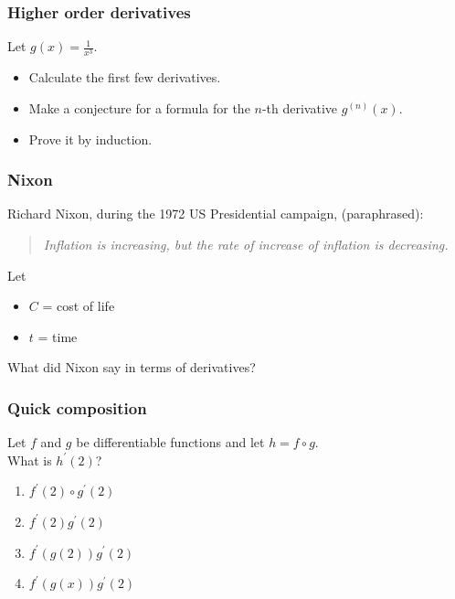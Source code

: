 \documentclass[14pt]{beamer}
\begin{document}
\begin{frame}[t]
	\frametitle{Higher order derivatives}

	Let $\displaystyle g(x) = \frac{1}{x^{3}}$.

	\begin{itemize}
		\item Calculate the first few derivatives.

		\item Make a conjecture for a formula for the $n$-th derivative $\displaystyle
			g^{(n)}(x)$.

		\item Prove it by induction.
	\end{itemize}
\end{frame}

\begin{frame}
	\frametitle{Nixon}

	Richard Nixon, during the 1972 US Presidential campaign, (paraphrased):

	\begin{quote}
		\emph{Inflation is increasing, but the rate of increase of inflation is decreasing.}
	\end{quote}

	\vfill

	Let
	\begin{itemize}
		\item $C$ = cost of life

		\item $t$ = time
	\end{itemize}
	What did Nixon say in terms of derivatives?

	\vfill
\end{frame}

\begin{frame}
	\frametitle{Quick composition}

	Let $f$ and $g$ be differentiable functions and let $h=f\circ g$. \\ What is $h
	^{\prime}(2)$? \begin {enumerate} \item $f^{\prime}(2)\circ g^{\prime}(2)$
	\item $f^{\prime}(2)g^{\prime}(2)$ \item $f^{\prime}(g(2)) g^{\prime}(2)$
	\item $f^{\prime}(g(x)) g^{\prime}(2)$ \end{enumerate}

\end{frame}
\end{document}
